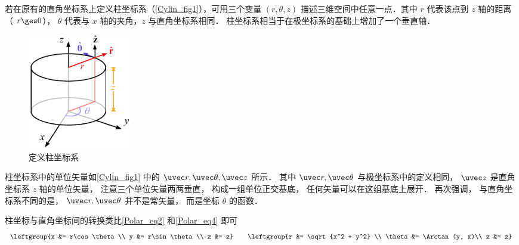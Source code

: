
若在原有的直角坐标系上定义柱坐标系（\autoref{Cylin_fig1}），可用三个变量 $(r, \theta, z)$ 描述三维空间中任意一点．其中 $r$ 代表该点到 $z$ 轴的距离（ $r \ges 0$）， $\theta$ 代表与 $x$ 轴的夹角，$z$ 与直角坐标系相同． 柱坐标系相当于在极坐标系的基础上增加了一个垂直轴．

\begin{figure}[ht]
\centering
\includegraphics[width=4.5cm]{./figures/Cylin1.pdf}
\caption{定义柱坐标系}\label{Cylin_fig1}
\end{figure}

柱坐标系中的单位矢量如\autoref{Cylin_fig1} 中的 $\uvec r,\uvec \theta ,\uvec z$ 所示． 其中 $\uvec r, \uvec \theta$ 与极坐标系中的定义相同， $\uvec z$ 是直角坐标系 $z$ 轴的单位矢量， 注意三个单位矢量两两垂直， 构成一组单位正交基底， 任何矢量可以在这组基底上展开． 再次强调， 与直角坐标系不同的是， $\uvec r, \uvec \theta$ 并不是常矢量， 而是坐标 $\theta$ 的函数．

柱坐标与直角坐标间的转换类比\autoref{Polar_eq2} 和\autoref{Polar_eq4} 即可
\begin{equation}
\leftgroup{x &= r\cos \theta \\
y &= r\sin \theta \\
z &= z}
\qquad
\leftgroup{r &= \sqrt {x^2 + y^2} \\
\theta  &= \Arctan(y, x)\\
z &= z}
\end{equation}

















